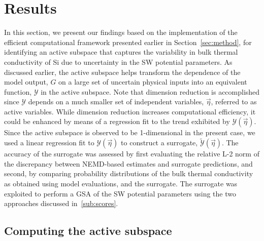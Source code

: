 \section{Results}
\label{sec:results}

In this section, we present our findings based on the implementation of the efficient computational framework 
presented earlier in Section~\ref{sec:method}, for identifying an active subspace that captures the variability
in bulk thermal conductivity of Si due to uncertainty in the SW potential parameters. As discussed earlier, the
active subspace helps transform the dependence of the model output, $G$ on a large set of uncertain physical
inputs into an equivalent function, $\mathcal{Y}$ in the active subspace. Note that dimension reduction is
accomplished since $\mathcal{Y}$ depends on a much smaller set of independent variables, $\vec\eta$,
referred to as active variables. While dimension reduction increases computational efficiency, it could be enhanced
by means of a regression fit to the trend exhibited by $\mathcal{Y}(\vec{\eta})$. Since the active subspace is
observed to be 1-dimensional in the present case, we used a linear regression fit to $\mathcal{Y}(\vec{\eta})$
to construct a surrogate, $\tilde{\mathcal{Y}}(\vec{\eta})$.
The accuracy of the surrogate was assessed by first evaluating the 
relative L-2 norm of the discrepancy between NEMD-based estimates and surrogate predictions,
and second, by comparing probability distributions of the bulk thermal conductivity as obtained using
model evaluations, and the surrogate. The surrogate was exploited to perform a GSA of the SW
potential parameters using the two approaches discussed in~\ref{sub:scores}.

\subsection{Computing the active subspace}
\label{sub:cas}

